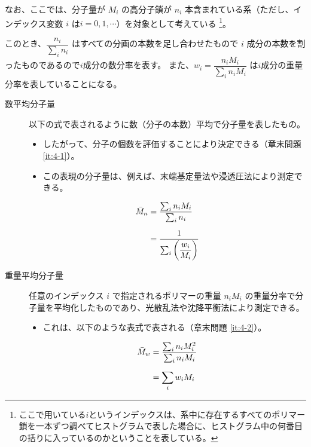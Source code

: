 \documentclass[a4paper,11pt]{ltjsarticle}
\begin{document}
なお、ここでは、分子量が $M_i$ の高分子鎖が $n_i$ 本含まれている系（ただし、インデックス変数 $i$ は$i=0,1,\cdots$）を対象として考えている
\footnote
{
ここで用いている$i$というインデックスは、系中に存在するすべてのポリマー鎖を一本ずつ調べてヒストグラムで表した場合に、ヒストグラム中の何番目の括りに入っているのかということを表している。
}。


このとき、$\dfrac{n_i}{\sum_i n_i}$ はすべての分画の本数を足し合わせたもので $i$ 成分の本数を割ったものであるので$i$成分の数分率を表す。
また、$w_i=\dfrac{n_i M_i}{\sum_i n_i M_i}$ は$i$成分の重量分率を表していることになる。

\begin{description}
	\item[数平均分子量] 以下の式で表されるように数（分子の本数）平均で分子量を表したもの。
	\begin{itemize}
		\item したがって、分子の個数を評価することにより決定できる（章末問題 \ref{it:4-1}）。
		\item この表現の分子量は、例えば、末端基定量法や浸透圧法により測定できる。
	\end{itemize}
		\begin{align}
		{\bar M}_n 
			&= \dfrac{\sum_i n_i M_i}{\sum_i n_i} \notag \\[6pt]
			&= \dfrac{1}{\sum_i \left(\dfrac{w_i}{M_i} \right)}
		\label{eq:Mn}
		\end{align}

\item[重量平均分子量] 任意のインデックス $i$ で指定されるポリマーの重量 $n_i M_i$ の重量分率で分子量を平均化したものであり、光散乱法や沈降平衡法により測定できる。
		\begin{itemize}
			\item これは、以下のような表式で表される（章末問題 \ref{it:4-2}）。
		\end{itemize}
		\begin{align}
		{\bar M}_w 
			&= \dfrac{\sum_i n_i M_i^2}{\sum_i n_i M_i}\notag \\[6pt]
			&= \displaystyle \sum_i w_i M_i
		\label{eq:Mw}
		\end{align}
\end{description}
\end{document}
